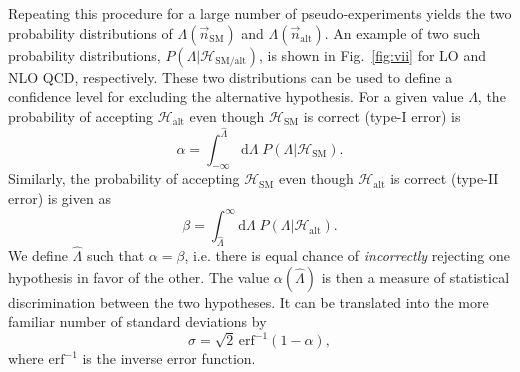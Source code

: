 \documentclass[preprint]{JHEP3}
\newcommand{\SM}{\mathrm{SM}}
\newcommand{\alt}{\mathrm{alt}}
\def\hLambda {\hat{\Lambda}}
\def\erf{\mathrm{erf}}
\def\HSM{\mathcal{H}_{\mathrm{SM}}}
\def\Halt{\mathcal{H}_{\mathrm{alt}}}
\newcommand{\ee}{\end{eqnarray}}
\begin{document}
Repeating this procedure for a large number of pseudo-experiments yields the two probability distributions of $\Lambda(\vec{n}_\mathrm{SM})$ and $\Lambda(\vec{n}_\mathrm{alt})$. 
An example of two such probability distributions, $P(\Lambda|\mathcal{H}_{\mathrm{SM/alt}})$, is shown in Fig.~\ref{fig:vii} for LO and NLO QCD, respectively.
These two distributions can be used to define a confidence level for excluding the alternative hypothesis.
For a given value $\hat{\Lambda}$, the probability of accepting $\mathcal{H}_{\alt}$ even though $\mathcal{H}_{\SM}$ is correct (type-I error) is
\begin{equation}
    \alpha = \int^{\hLambda}_{-\infty} \mathrm{d}\Lambda \; P(\Lambda | {\HSM}).
\end{equation}
Similarly, the probability of accepting $\mathcal{H}_{\SM}$ even though $\mathcal{H}_{\alt}$ is correct (type-II error) is given as 
\begin{equation}
    \beta = \int_{\hLambda}^{\infty} \mathrm{d}\Lambda \; P(\Lambda|\Halt).
\end{equation}
We define $\hLambda$ such that $\alpha=\beta$, i.e. there is equal chance of {\it incorrectly} rejecting one hypothesis in favor of the other. 
The value $\alpha(\hLambda)$ is then a measure of statistical discrimination between the two hypotheses. 
It can be translated into the more familiar number of standard deviations by 
\begin{equation}
\sigma = \sqrt{2} \, \erf^{-1}(1-\alpha),
\end{equation}
where $\erf^{-1}$ is the inverse error function. 
\end{document}
